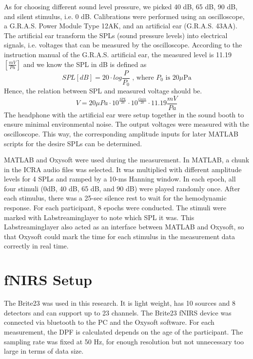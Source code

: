 As for choosing different sound level pressure, we picked 40 dB, 65 dB, 90 dB, and silent stimulus, i.e. 0 dB. Calibrations were performed using an oscilloscope, a G.R.A.S. Power Module Type 12AK,  and an artificial ear (G.R.A.S. 43AA). The artificial ear transform the SPLs (sound pressure levels) into electrical signals, i.e. voltages that can be measured by the oscilloscope. According to the instruction manual of the G.R.A.S. artificial ear, the measured level is 11.19 $[ \frac {mV}{Pa}]$ and we know the SPL in dB is defined as 
\begin{equation}
SPL [dB] = 20 \cdot log \frac{P}{P_0} \text{ , where $P_0$ is $20 \mu$Pa}
\end{equation}
Hence, the relation between SPL and measured voltage should be.
\begin{equation}
V = 20{ \mu Pa} \cdot 10^{\frac {SPL}{20}}  \cdot 10^{\frac{Gain}{20}} \cdot 11.19 {\frac {mV}{Pa}} 
\end{equation}
The headphone with the artificial ear were setup together in the sound booth to ensure minimal environmental noise. The output voltages were measured with the oscilloscope. This way, the corresponding amplitude inputs for later MATLAB scripts for the desire SPLs can be determined.

MATLAB and Oxysoft were used during the measurement. In MATLAB, a chunk in the ICRA audio files was selected. It was multiplied with different amplitude levels for 4 SPLs and ramped by a 10-ms Hanning window. In each epoch, all four stimuli (0dB, 40 dB, 65 dB, and 90 dB) were played randomly once. After each stimulus, there was a 25-sec silence rest to wait for the hemodynamic response. For each participant, 8 epochs were conducted. The stimuli were marked with Labstreaminglayer to note which SPL it was. This Labstreaminglayer also acted as an interface between MATLAB and Oxysoft, so that Oxysoft could mark the time for each stimulus in the measurement data correctly in real time.

\section {fNIRS Setup}
The Brite23 was used in this research. It is light weight, has 10 sources and 8 detectors and can support up to 23 channels. The Brite23 fNIRS device was connected via bluetooth to the PC and the Oxysoft software. For each measurement, the DPF is calculated depends on the age of the participant. The sampling rate was fixed at 50 Hz, for enough resolution but not unnecessary too large in terms of data size.

